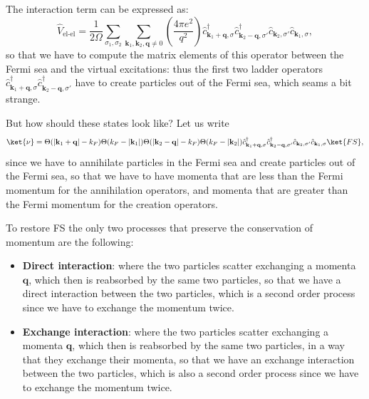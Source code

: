 The interaction term can be expressed as:
\[
    \hat{V}_{\text{el-el}} = \frac{1}{2\Omega} \sum_{\sigma_1, \sigma_2} \sum_{\mathbf{k}_1, \mathbf{k}_2, \mathbf{q}\neq 0} \left( \frac{4 \pi e^2}{q^2} \right) \hat{c}_{\mathbf{k}_1 + \mathbf{q}, \sigma}^\dagger \hat{c}_{\mathbf{k}_2 - \mathbf{q}, \sigma'}^\dagger \hat{c}_{\mathbf{k}_2, \sigma'} \hat{c}_{\mathbf{k}_1, \sigma},
\]
so that we have to compute the matrix elements of this operator between the Fermi sea and the virtual excitations: thus the first two ladder operators \(\hat{c}_{\mathbf{k}_1 + \mathbf{q}, \sigma}^\dagger \hat{c}_{\mathbf{k}_2 - \mathbf{q}, \sigma'}^\dagger\) have to create particles out of the Fermi sea, which seams a bit strange.

But how should these states look like? Let us write
\[
    \ket{\nu} = \Theta(\vert \mathbf{k}_1 + \mathbf{q} \vert -k_F) \Theta(k_F - \vert \mathbf{k}_1 \vert) \Theta(\vert \mathbf{k}_2 - \mathbf{q} \vert -k_F) \Theta(k_F - \vert \mathbf{k}_2 \vert) \hat{c}_{\mathbf{k}_1 + \mathbf{q}, \sigma}^\dagger \hat{c}_{\mathbf{k}_2 - \mathbf{q}, \sigma'}^\dagger \hat{c}_{\mathbf{k}_2, \sigma'} \hat{c}_{\mathbf{k}_1, \sigma} \ket{FS},
\]
since we have to annihilate particles in the Fermi sea and create particles out of the Fermi sea, so that we have to have momenta that are less than the Fermi momentum for the annihilation operators, and momenta that are greater than the Fermi momentum for the creation operators.

To restore FS the only two processes that preserve the conservation of momentum are the following:
\begin{itemize}
    \item \textbf{Direct interaction}: where the two particles scatter exchanging a momenta \(\mathbf{q}\), which then is reabsorbed by the same two particles, so that we have a direct interaction between the two particles, which is a second order process since we have to exchange the momentum twice.
    \item \textbf{Exchange interaction}: where the two particles scatter exchanging a momenta \(\mathbf{q}\), which then is reabsorbed by the same two particles, in a way that they exchange their momenta, so that we have an exchange interaction between the two particles, which is also a second order process since we have to exchange the momentum twice.
\end{itemize} 

